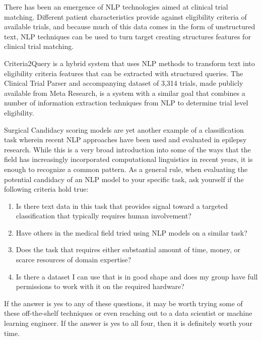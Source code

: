 There has been an emergence of NLP technologies aimed at clinical trial matching. Different patient characteristics provide against eligibility
criteria of available trials, and because much of this data comes in the form of unstructured text, NLP techniques can be used to turn target
creating structures features for clinical trial matching.

Criteria2Query \cite{10.1093/jamia/ocy178} is a hybrid system that uses NLP methods to transform text into eligibility criteria features that can
be extracted with structured queries. The Clinical Trial Parser and accompanying dataset of 3,314 trials\cite{tseo2020information}, made
publicly available from Meta Research, is a system with a similar goal that combines a number of information extraction techniques from NLP to determine
trial level eligibility.

Surgical Candidacy scoring models are yet another example of a classification task wherein recent NLP approaches have been used and evaluated \cite{Wissel2019ProspectiveVO}
in epilepsy research. While this is a very broad introduction into some of the ways that the field has increasingly incorporated computational linguistics in recent years, it is enough
to recognize a common pattern. As a general rule, when evaluating the potential candidacy of an NLP model to your specific task, ask yourself if the following criteria hold true:
\begin{enumerate}
  \item Is there text data in this task that provides signal toward a targeted classification that typically requires human involvement?
  \item Have others in the medical field tried using NLP models on a similar task?
  \item Does the task that requires either substantial amount of time, money, or scarce resources of domain expertise?
  \item Is there a dataset I can use that is in good shape and does my group have full permissions to work with it on the required hardware?
\end{enumerate}

If the answer is yes to any of these questions, it may be worth trying some of these off-the-shelf techniques or even reaching out to a data scientist or machine learning engineer.
If the answer is yes to all four, then it is definitely worth your time.
